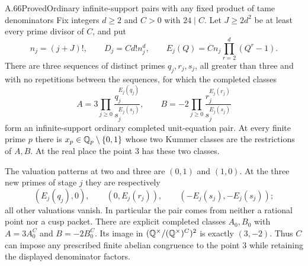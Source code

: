 \begin{statement}{A.66}{Proved}{Ordinary infinite-support pairs with any fixed product of tame denominators}
Fix integers $d\ge2$ and $C>0$ with $24\mid C$.
Let $J\ge2d^2$ be at least every prime divisor of $C$, and put
\[
 n_j=(j+J)!,\qquad D_j=Cd!n_j^d,\qquad
 E_j(Q)=Cn_j\prod_{r=2}^{d}(Q^r-1).
 \tag{A.66.1}
\]
There are three sequences of distinct primes $q_j,r_j,s_j$, all
greater than three and with no repetitions between the sequences,
for which the completed classes
\[
 A=3\prod_{j\ge0}\frac{q_j^{E_j(q_j)}}{s_j^{E_j(s_j)}},
 \qquad
 B=-2\prod_{j\ge0}\frac{r_j^{E_j(r_j)}}{s_j^{E_j(s_j)}}
 \tag{A.66.2}
\]
form an infinite-support ordinary completed unit-equation pair.
At every finite prime $p$ there is $x_p\in\mathbb Q_p\setminus\{0,1\}$
whose two Kummer classes are the restrictions of $A,B$.
At the real place the point $3$ has these two classes.

The valuation patterns at two and three are $(0,1)$ and $(1,0)$.
At the three new primes of stage $j$ they are respectively
\[
 (E_j(q_j),0),\qquad(0,E_j(r_j)),\qquad
 (-E_j(s_j),-E_j(s_j));
 \tag{A.66.3}
\]
all other valuations vanish.  In particular the pair comes from
neither a rational point nor a cusp packet.  There are explicit
completed classes $A_0,B_0$ with $A=3A_0^C$ and
$B=-2B_0^C$.  Its image in
$(\mathbb Q^\times/(\mathbb Q^\times)^C)^2$ is exactly $(3,-2)$.
Thus $C$ can impose any prescribed finite abelian congruence to
the point $3$ while retaining the displayed denominator factors.
\end{statement}
